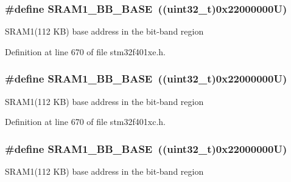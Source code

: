 \subsubsection[{\texorpdfstring{S\+R\+A\+M1\+\_\+\+B\+B\+\_\+\+B\+A\+SE}{SRAM1_BB_BASE}}]{\setlength{\rightskip}{0pt plus 5cm}\#define S\+R\+A\+M1\+\_\+\+B\+B\+\_\+\+B\+A\+SE~((uint32\+\_\+t)0x22000000\+U)}\hypertarget{group___peripheral__registers__structures_gac4c4f61082e4b168f29d9cf97dc3ca5c}{}\label{group___peripheral__registers__structures_gac4c4f61082e4b168f29d9cf97dc3ca5c}
S\+R\+A\+M1(112 K\+B) base address in the bit-\/band region 

Definition at line 670 of file stm32f401xe.\+h.

\subsubsection[{\texorpdfstring{S\+R\+A\+M1\+\_\+\+B\+B\+\_\+\+B\+A\+SE}{SRAM1_BB_BASE}}]{\setlength{\rightskip}{0pt plus 5cm}\#define S\+R\+A\+M1\+\_\+\+B\+B\+\_\+\+B\+A\+SE~((uint32\+\_\+t)0x22000000\+U)}\hypertarget{group___peripheral__registers__structures_gac4c4f61082e4b168f29d9cf97dc3ca5c}{}\label{group___peripheral__registers__structures_gac4c4f61082e4b168f29d9cf97dc3ca5c}
S\+R\+A\+M1(112 K\+B) base address in the bit-\/band region 

Definition at line 670 of file stm32f401xc.\+h.

\subsubsection[{\texorpdfstring{S\+R\+A\+M1\+\_\+\+B\+B\+\_\+\+B\+A\+SE}{SRAM1_BB_BASE}}]{\setlength{\rightskip}{0pt plus 5cm}\#define S\+R\+A\+M1\+\_\+\+B\+B\+\_\+\+B\+A\+SE~((uint32\+\_\+t)0x22000000\+U)}\hypertarget{group___peripheral__registers__structures_gac4c4f61082e4b168f29d9cf97dc3ca5c}{}\label{group___peripheral__registers__structures_gac4c4f61082e4b168f29d9cf97dc3ca5c}
S\+R\+A\+M1(112 K\+B) base address in the bit-\/band region 

